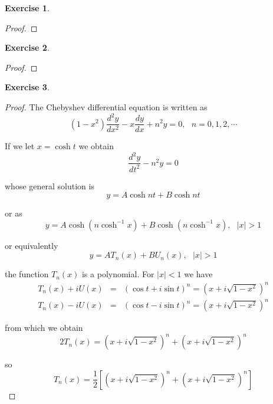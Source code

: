 \documentclass[11pt,a4paper]{article}
\renewcommand{\(}{\left(}
\renewcommand{\)}{\right)}
\newtheorem{exercise}{Exercise}
\begin{document}
\begin{exercise}
\end{exercise}  
\begin{proof}
	
\end{proof}


\begin{exercise}
\end{exercise}  
\begin{proof}
	
\end{proof}



\begin{exercise}
\end{exercise}  
\begin{proof}
	The Chebyshev differential equation is written as%
	\[
	\left( 1-x^{2}\right) \frac{d^{2}y}{dx^{2}}-x\frac{dy}{dx}+n^{2}y=0,\text{ }%
	n=0,1,2,\cdots 
	\]
	
	If we let $x=\cosh t$ we obtain%
	\[
	\frac{d^{2}y}{dt^{2}}-n^{2}y=0
	\]
	
	whose general solution is 
	\[
	y=A\cosh nt+B\cosh nt
	\]
	
	or as 
	\[
	y=A\cosh \left( n\cosh ^{-1}x\right) +B\cosh \left( n\cosh ^{-1}x\right) ,%
	\text{ }\left\vert x\right\vert >1
	\]
	
	or equivalently%
	\[
	y=AT_{n}(x)+BU_{n}(x),\text{ }\left\vert x\right\vert >1
	\]
	
	the function $T_{n}(x)$ is a polynomial. For $\left\vert x\right\vert <1$ we
	have%
	\begin{eqnarray*}
		T_{n}(x)+iU(x) &=&\left( \cos t+i\sin t\right) ^{n}=\left( x+i\sqrt{1-x^{2}}%
		\right) ^{n} \\
		T_{n}(x)-iU(x) &=&\left( \cos t-i\sin t\right) ^{n}=\left( x+i\sqrt{1-x^{2}}%
		\right) ^{n}
	\end{eqnarray*}
	
	from which we obtain%
	\[
	2T_{n}(x)=\left( x+i\sqrt{1-x^{2}}\right) ^{n}+\left( x+i\sqrt{1-x^{2}}%
	\right) ^{n}
	\]
	
	so%
	\[
	T_{n}(x)=\frac{1}{2}\left[ \left( x+i\sqrt{1-x^{2}}\right) ^{n}+\left( x+i%
	\sqrt{1-x^{2}}\right) ^{n}\right] 
	\]
\end{proof}
\end{document}
